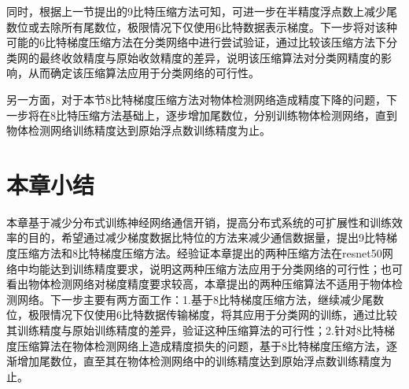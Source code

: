 同时，根据上一节提出的9比特压缩方法可知，可进一步在半精度浮点数上减少尾数位或去除所有尾数位，极限情况下仅使用6比特数据表示梯度。下一步将对该种可能的6比特梯度压缩方法在分类网络中进行尝试验证，通过比较该压缩方法下分类网的最终收敛精度与原始收敛精度的差异，说明该压缩算法对分类网精度的影响，从而确定该压缩算法应用于分类网络的可行性。

另一方面，对于本节8比特梯度压缩方法对物体检测网络造成精度下降的问题，下一步将在8比特压缩方法基础上，逐步增加尾数位，分别训练物体检测网络，直到物体检测网络训练精度达到原始浮点数训练精度为止。
\section{本章小结}
本章基于减少分布式训练神经网络通信开销，提高分布式系统的可扩展性和训练效率的目的，希望通过减少梯度数据比特位的方法来减少通信数据量，提出9比特梯度压缩方法和8比特梯度压缩方法。经验证本章提出的两种压缩方法在resnet50网络中均能达到训练精度要求，说明这两种压缩方法应用于分类网络的可行性；也可看出物体检测网络对梯度精度要求较高，本章提出的两种压缩算法不适用于物体检测网络。下一步主要有两方面工作：1.基于8比特梯度压缩方法，继续减少尾数位，极限情况下仅使用6比特数据传输梯度，将其应用于分类网的训练，通过比较其训练精度与原始训练精度的差异，验证这种压缩算法的可行性；2.针对8比特梯度压缩算法在物体检测网络上造成精度损失的问题，基于8比特梯度压缩方法，逐渐增加尾数位，直至其在物体检测网络中的训练精度达到原始浮点数训练精度为止。







